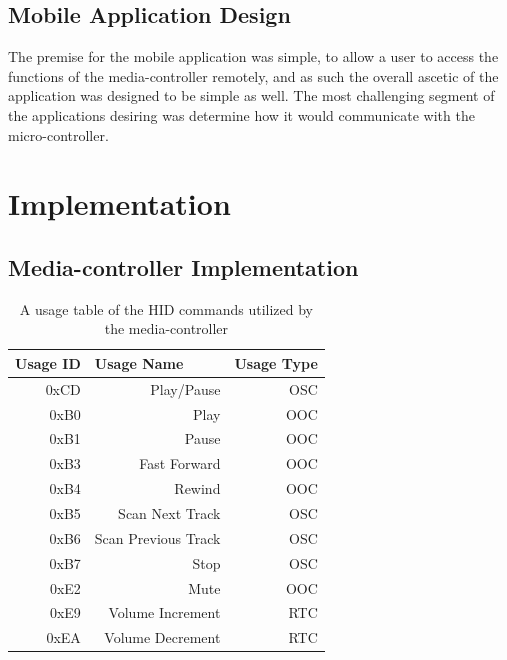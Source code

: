 \documentclass{article}
\begin{document}
		\subsection{Mobile Application Design}
			The premise for the mobile application was simple, to allow a user to access the functions of the media-controller remotely, and as such the overall ascetic of the application was designed to be simple as well. The most challenging segment of the applications desiring was determine how it would communicate with the micro-controller.
			
			\lipsum[1]
			

	\section{Implementation}
		\subsection{Media-controller Implementation}
			\lipsum[1]
			
			\begin{table}[h]
				\centering
				\caption{A usage table of the HID commands utilized by the media-controller}
				\label{usageTable}
				\begin{tabular}{|r|r|r|}
					\hline
					\multicolumn{1}{|l|}{Usage ID} & \multicolumn{1}{l|}{Usage Name} & \multicolumn{1}{l|}{Usage Type} \\ \hline
					0xCD                           & Play/Pause                      & OSC                             \\
					0xB0                           & Play                            & OOC                             \\
					0xB1                           & Pause                           & OOC                             \\
					0xB3                           & Fast Forward                    & OOC                             \\
					0xB4                           & Rewind                          & OOC                             \\
					0xB5                           & Scan Next Track                 & OSC                             \\
					0xB6                           & Scan Previous Track             & OSC                             \\
					0xB7                           & Stop                            & OSC                             \\
					0xE2                           & Mute                            & OOC                             \\
					0xE9                           & Volume Increment                & RTC                             \\
					0xEA                           & Volume Decrement                & RTC                             \\ \hline
				\end{tabular}
			\end{table}
			
\end{document}
